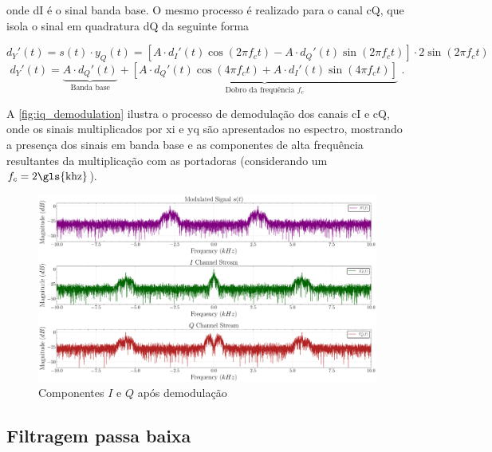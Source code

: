 \noindent onde \gls{dI} é o sinal banda base. O mesmo processo é realizado para o canal \gls{cQ}, que isola o sinal em quadratura \gls{dQ} da seguinte forma

\vspace{-1.2em}
\begin{equation}
d_Y'(t) = s(t) \cdot y_Q(t) = \left[A \cdot d_I'(t) \cos(2\pi f_c t ) - A \cdot d_Q'(t) \sin(2\pi f_c t )\right] \cdot 2\sin(2\pi f_c t )
\end{equation}
\vspace{-0.8em}
\begin{equation}
    d_Y'(t) =  
    \underbrace{A \cdot d_Q'(t)}_{\text{Banda base}} + 
    \underbrace{\left[
        A \cdot d_Q'(t) \cos(4\pi f_c t ) 
        + A \cdot d_I'(t) \sin(4\pi f_c t )
    \right]}_{\text{Dobro da frequência $f_c$}} \text{ .}
\end{equation}

A \autoref{fig:iq_demodulation} ilustra o processo de demodulação dos canais \gls{cI} e \gls{cQ}, onde os sinais multiplicados por \gls{xi} e \gls{yq} são apresentados no espectro, mostrando a presença dos sinais em banda base e as componentes de alta frequência resultantes da multiplicação com as portadoras (considerando um $f_c = 2 \text{\gls{khz}}$). \cite{cnes_services_and_message_formats_ed2_rev2_2006}

\begin{figure}[H]
	\centering
	\caption{Componentes $I$ e $Q$ após demodulação}\label{fig:iq_demodulation}
	\includegraphics[width=\linewidth]{assets/cap2/receiver_demodulator_freq.pdf}
\end{figure}


\subsection{Filtragem passa baixa}\label{sec:filtering}

